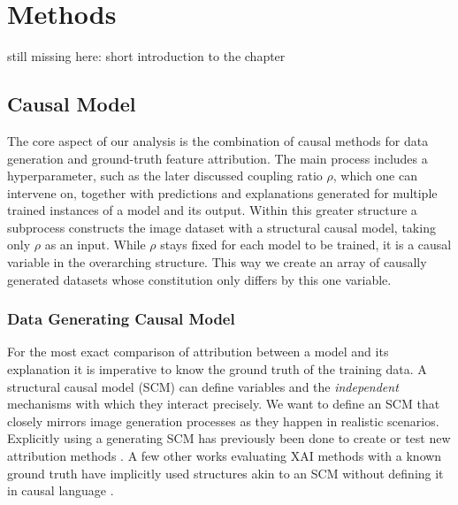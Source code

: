 \chapter{Methods}\label{chapter:method}
still missing here:  short introduction to the chapter

\section{Causal Model}\label{section:causal_model}
The core aspect of our analysis is the combination of causal methods for data generation and ground-truth feature attribution. 
The main process includes a hyperparameter, such as the later discussed coupling ratio $\rho$, which one can intervene on, together with predictions and explanations generated for multiple trained instances of a model and its output. 
Within this greater structure a subprocess constructs the image dataset with a structural causal model, taking only $\rho$ as an input. While $\rho$ stays fixed for each model to be trained, it is a causal variable in the overarching structure. This way we create an array of causally generated datasets whose constitution only differs by this one variable. 

\subsection{Data Generating Causal Model}\label{section:data_gen_causal_model}
For the most exact comparison of attribution between a model and its explanation it is imperative to know the ground truth of the training data. A structural causal model (SCM) can define variables and the \textit{independent} mechanisms with which they interact precisely. We want to define an SCM that closely mirrors image generation processes as they happen in realistic scenarios. 
Explicitly using a generating SCM has previously been done to create or test new attribution methods \citep{Parafita2019, Wilming2023, Clark2023, Goyal2019, Reimers2019, Reimers2020}. A few other works evaluating XAI methods with a known ground truth have implicitly used structures akin to an SCM without defining it in causal language \citep{Kim2018, Yang2019, Arras2022}. 

